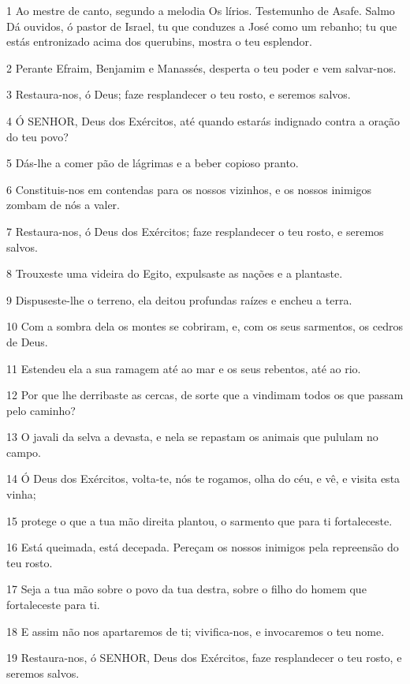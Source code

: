 \par 1 Ao mestre de canto, segundo a melodia Os lírios. Testemunho de Asafe. Salmo Dá ouvidos, ó pastor de Israel, tu que conduzes a José como um rebanho; tu que estás entronizado acima dos querubins, mostra o teu esplendor.
\par 2 Perante Efraim, Benjamim e Manassés, desperta o teu poder e vem salvar-nos.
\par 3 Restaura-nos, ó Deus; faze resplandecer o teu rosto, e seremos salvos.
\par 4 Ó SENHOR, Deus dos Exércitos, até quando estarás indignado contra a oração do teu povo?
\par 5 Dás-lhe a comer pão de lágrimas e a beber copioso pranto.
\par 6 Constituis-nos em contendas para os nossos vizinhos, e os nossos inimigos zombam de nós a valer.
\par 7 Restaura-nos, ó Deus dos Exércitos; faze resplandecer o teu rosto, e seremos salvos.
\par 8 Trouxeste uma videira do Egito, expulsaste as nações e a plantaste.
\par 9 Dispuseste-lhe o terreno, ela deitou profundas raízes e encheu a terra.
\par 10 Com a sombra dela os montes se cobriram, e, com os seus sarmentos, os cedros de Deus.
\par 11 Estendeu ela a sua ramagem até ao mar e os seus rebentos, até ao rio.
\par 12 Por que lhe derribaste as cercas, de sorte que a vindimam todos os que passam pelo caminho?
\par 13 O javali da selva a devasta, e nela se repastam os animais que pululam no campo.
\par 14 Ó Deus dos Exércitos, volta-te, nós te rogamos, olha do céu, e vê, e visita esta vinha;
\par 15 protege o que a tua mão direita plantou, o sarmento que para ti fortaleceste.
\par 16 Está queimada, está decepada. Pereçam os nossos inimigos pela repreensão do teu rosto.
\par 17 Seja a tua mão sobre o povo da tua destra, sobre o filho do homem que fortaleceste para ti.
\par 18 E assim não nos apartaremos de ti; vivifica-nos, e invocaremos o teu nome.
\par 19 Restaura-nos, ó SENHOR, Deus dos Exércitos, faze resplandecer o teu rosto, e seremos salvos.

